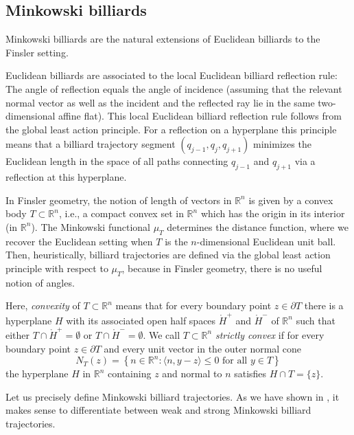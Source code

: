 \documentclass[12pt]{amsart}
\theoremstyle{plain}
\theoremstyle{remark}
\theoremstyle{definition}
\newcommand{\R}{\mathbb{R}}
\def\beqq{\begin{equation*}}\def\eeqq{\end{equation*}}
\begin{document}
\subsection{Minkowski billiards}

Minkowski billiards are the natural extensions of Euclidean billiards to the Finsler setting.

Euclidean billiards are associated to the local Euclidean billiard reflection rule: The angle of reflection equals the angle of incidence (assuming that the relevant normal vector as well as the incident and the reflected ray lie in the same two-dimensional affine flat). This local Euclidean billiard reflection rule follows from the global least action principle. For a reflection on a hyperplane this principle means that a billiard trajectory segment $(q_{j-1},q_j,q_{j+1})$ minimizes the Euclidean length in the space of all paths connecting $q_{j-1}$ and $q_{j+1}$ via a reflection at this hyperplane.

In Finsler geometry, the notion of length of vectors in $\R^n$ is given by a convex body $T\subset\R^n$, i.e., a compact convex set in $\R^n$ which has the origin in its interior (in $\R^n$). The Minkowski functional $\mu_T$ determines the distance function, where we recover the Euclidean setting when $T$ is the $n$-dimensional Euclidean unit ball. Then, heuristically, billiard trajectories are defined via the global least action principle with respect to $\mu_T$, because in Finsler geometry, there is no useful notion of angles.

Here, \textit{convexity} of $T\subset\R^n$ means that for every boundary point $z\in\partial T$ there is a hyperplane $H$ with its associated open half spaces $\mathring{H}^+$ and $\mathring{H}^-$ of $\R^n$ such that either $T\cap \mathring{H}^+=\emptyset$ or $T\cap \mathring{H}^-=\emptyset$. We call $T\subset\R^n$ \textit{strictly convex} if for every boundary point $z\in\partial T$ and every unit vector in the outer normal cone
\beqq N_T(z)=\left\{n\in\R^n : \langle n,y-z\rangle \leq 0 \text{ for all } y\in T\right\}\eeqq
the hyperplane $H$ in $\R^n$ containing $z$ and normal to $n$ satisfies $H\cap T =\{z\}$.

Let us precisely define Minkowski billiard trajectories. As we have shown in \cite{KruppRudolf2022}, it makes sense to differentiate between weak and strong Minkowski billiard trajectories.
\end{document}
